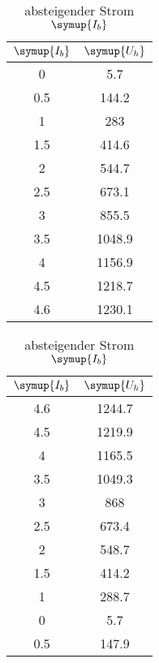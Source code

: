    \begin{table}[!ht]
    \caption*{\textbf{Magnetfeldstärke}}
    \begin{minipage}{0.49\textwidth}
          \centering  
          \caption{ansteigender Strom $\symup{I_b}$}
          \label{tab:bconst}
          \begin{tabular}{c c}
            \toprule
            $\symup{I_b}$ & $\symup{U_h}$ \\
            \midrule
                0   &  5.7 \\
                0.5 & 144.2 \\
                1   & 283 \\
                1.5 & 414.6 \\
                2   & 544.7 \\
                2.5 & 673.1 \\
                3   & 855.5 \\
                3.5 & 1048.9 \\
                4   & 1156.9 \\
                4.5 & 1218.7 \\
                4.6 & 1230.1 \\
            \bottomrule
        \end{tabular}
    \end{minipage}
    \hfill
    \begin{minipage}{0.49\textwidth}
        \centering
          \caption{absteigender Strom $\symup{I_b}$}
          \label{tab:bconst-}
           \begin{tabular}{c c}
            \toprule
            $\symup{I_b}$ & $\symup{U_h}$ \\
            \midrule
            4.6 & 1244.7  \\
            4.5 & 1219.9 \\
            4   & 1165.5 \\
            3.5 & 1049.3 \\
            3   & 868 \\
            2.5 & 673.4 \\
            2   & 548.7 \\
            1.5 & 414.2 \\
            1   & 288.7 \\
            0   & 5.7 \\
            0.5 & 147.9 \\
            \bottomrule
       \end{tabular}
     \end{minipage}
  \end{table}